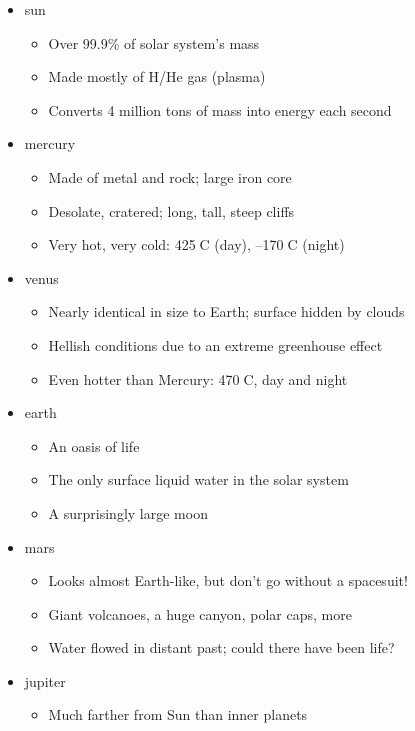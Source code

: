 \documentclass[12pt]{article}
\begin{document}
\begin{itemize}
    \item sun
    \begin{itemize}
        \item Over 99.9\% of solar system's mass
        \item Made mostly of H/He gas (plasma)
        \item Converts 4 million tons of mass into energy each second
    \end{itemize}
    \item mercury
    \begin{itemize}
        \item Made of metal and rock; large iron core
        \item Desolate, cratered; long, tall, steep cliffs
        \item Very hot, very cold: 425C (day), –170C (night)
    \end{itemize}
    \item venus
    \begin{itemize}
        \item Nearly identical in size to Earth; surface hidden by clouds
        \item Hellish conditions due to an extreme greenhouse effect
        \item Even hotter than Mercury: 470C, day and night
    \end{itemize}
    \item earth
    \begin{itemize}
        \item An oasis of life
        \item The only surface liquid water in the solar system
        \item A surprisingly large moon
    \end{itemize}
    \item mars
    \begin{itemize}
        \item Looks almost Earth-like, but don't go without a spacesuit!
        \item Giant volcanoes, a huge canyon, polar caps, more
        \item Water flowed in distant past; could there have been life?
    \end{itemize}
    \item jupiter
    \begin{itemize}
        \item Much farther from Sun than inner planets

\end{itemize}
\end{itemize}
\end{document}
